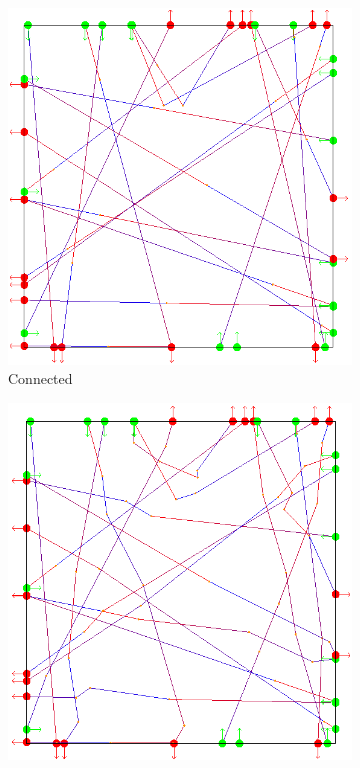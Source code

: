 \begin{figure}[t]
\begin{subfigure}[b]{0.24\linewidth}
 	\includegraphics[width=\linewidth]{images/steps-connected.png}
 	\caption{Connected}
 \end{subfigure}
 \begin{subfigure}[b]{0.24\linewidth}
 	\includegraphics[width=\linewidth]{images/steps-collisionFree.png}

\end{subfigure}
\end{figure}
